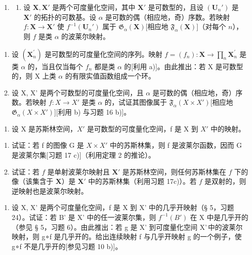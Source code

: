 \begin{enumerate}
\def\labelenumi{\arabic{enumi})}
\setcounter{enumi}{16}
\tightlist
\item
  \begin{enumerate}
  \def\labelenumii{\alph{enumii})}
  \tightlist
  \item
    设 \(\mathbf{X}, \mathbf{X}'\) 是两个可度量化空间，其中 \(\mathbf{X}'\) 是可数型的，且设 \((\mathbf{U}_n')\) 是 \(\mathbf{X}'\) 的拓扑的可数基。设 \(\alpha\) 是可数的偶（相应地，奇）序数。若映射 \(f: \mathbf{X} \to \mathbf{X}'\) 使 \(f^{-1}(\mathbf{U}_n')\) 属于 \(\mathfrak{G}_{\alpha}(\mathbf{X})\){[}相应地 \(\mathfrak{F}_{\alpha}(\mathbf{X})\){]}（对每个 \(n\)），则 \(f\) 是类 \(\alpha\) 的波莱尔映射。
  \end{enumerate}
\end{enumerate}

\begin{enumerate}
\def\labelenumi{\alph{enumi})}
\setcounter{enumi}{1}
\item
  设 \((\mathbf{X}_{n}^{\prime})\) 是可数型的可度量化空间的序列。映射 \(f = (f_{n}) : \mathbf{X} \to \prod_{n} \mathbf{X}_{n}^{\prime}\) 是类 \(\alpha\) 的，当且仅当每个 \(f_{n}\) 都是类 \(\alpha\) 的{[}利用 a){]}。由此推出：若 X 是可数型的，则 X 上类 \(\alpha\) 的有限实值函数组成一个环。
\item
  设 X, X' 是两个可数型的可度量化空间，且 \(\alpha\) 是可数的偶（相应地，奇）序数。若映射 \(f: X \to X'\) 是类 \(\alpha\) 的，试证其图像属于 \(\mathfrak{F}_{\alpha}(X \times X')\){[}相应地 \(\mathfrak{G}_{\alpha}(X \times X')\){]}{[}利用 b) 与习题 16 b){]}。
\end{enumerate}

\begin{enumerate}
\def\labelenumi{\arabic{enumi})}
\setcounter{enumi}{17}
\tightlist
\item
  设 X 是苏斯林空间，\(X'\) 是可数型的可度量化空间，f 是 X 到 \(X'\) 中的映射。
\end{enumerate}

\begin{enumerate}
\def\labelenumi{\alph{enumi})}
\item
  试证：若 f 的图像 G 是 \(X \times X'\) 中的苏斯林集，则 f 是波莱尔函数，因而 G 是波莱尔集{[}习题 17 c){]}（利用定理 2 的推论）。
\item
  试证：若 \(f\) 是单射波莱尔映射且 \(\mathbf{X}'\) 是苏斯林空间，则任何苏斯林集在 \(f\) 下的像（该集含于 \(\mathbf{X}\)）是 \(\mathbf{X}'\) 中的苏斯林集（利用习题 17c)）。若 \(f\) 是双射的，则逆映射也是波莱尔映射。
\end{enumerate}

\begin{enumerate}
\def\labelenumi{\arabic{enumi})}
\setcounter{enumi}{18}
\tightlist
\item
  设 X, X' 是两个可度量化空间，f 是 X 到 X' 中的几乎开映射（§ 5，习题 24）。试证：若 B' 是 X' 中的任一波莱尔集，则 \(f^{-1}(B')\) 在 X 中是几乎开的（参见 § 5，习题 6）。由此推出：若 g 是 X' 到可度量化空间 X'\,中的波莱尔映射，则 g∘f 是几乎开的。给出连续映射 f 与几乎开映射 g 的一个例子，使 g∘f 不是几乎开的{[}参见习题 10 b){]}。
\end{enumerate}

